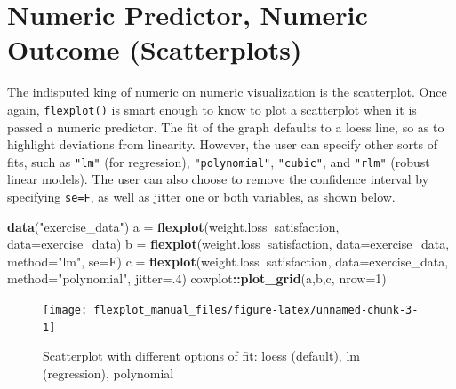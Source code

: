 \documentclass[,]{book}
\newenvironment{Shaded}{\begin{snugshade}}{\end{snugshade}}
\newcommand{\KeywordTok}[1]{\textcolor[rgb]{0.13,0.29,0.53}{\textbf{#1}}}
\newcommand{\DataTypeTok}[1]{\textcolor[rgb]{0.13,0.29,0.53}{#1}}
\newcommand{\DecValTok}[1]{\textcolor[rgb]{0.00,0.00,0.81}{#1}}
\newcommand{\StringTok}[1]{\textcolor[rgb]{0.31,0.60,0.02}{#1}}
\newcommand{\OperatorTok}[1]{\textcolor[rgb]{0.81,0.36,0.00}{\textbf{#1}}}
\newcommand{\NormalTok}[1]{#1}
\begin{document}
\section*{Numeric Predictor, Numeric Outcome
(Scatterplots)}\label{numeric-predictor-numeric-outcome-scatterplots}

The indisputed king of numeric on numeric visualization is the
scatterplot. Once again, \texttt{flexplot()} is smart enough to know to
plot a scatterplot when it is passed a numeric predictor. The fit of the
graph defaults to a loess line, so as to highlight deviations from
linearity. However, the user can specify other sorts of fits, such as
\texttt{"lm"} (for regression), \texttt{"polynomial"}, \texttt{"cubic"},
and \texttt{"rlm"} (robust linear models). The user can also choose to
remove the confidence interval by specifying \texttt{se=F}, as well as
jitter one or both variables, as shown below.

\begin{Shaded}
\begin{Highlighting}[]
\KeywordTok{data}\NormalTok{(}\StringTok{"exercise_data"}\NormalTok{)}
\NormalTok{a =}\StringTok{ }\KeywordTok{flexplot}\NormalTok{(weight.loss}\OperatorTok{~}\NormalTok{satisfaction, }\DataTypeTok{data=}\NormalTok{exercise_data)}
\NormalTok{b =}\StringTok{ }\KeywordTok{flexplot}\NormalTok{(weight.loss}\OperatorTok{~}\NormalTok{satisfaction, }\DataTypeTok{data=}\NormalTok{exercise_data, }
             \DataTypeTok{method=}\StringTok{"lm"}\NormalTok{, }\DataTypeTok{se=}\NormalTok{F)}
\NormalTok{c =}\StringTok{ }\KeywordTok{flexplot}\NormalTok{(weight.loss}\OperatorTok{~}\NormalTok{satisfaction, }\DataTypeTok{data=}\NormalTok{exercise_data, }
             \DataTypeTok{method=}\StringTok{"polynomial"}\NormalTok{, }\DataTypeTok{jitter=}\NormalTok{.}\DecValTok{4}\NormalTok{)}
\NormalTok{cowplot}\OperatorTok{::}\KeywordTok{plot_grid}\NormalTok{(a,b,c, }\DataTypeTok{nrow=}\DecValTok{1}\NormalTok{)}
\end{Highlighting}
\end{Shaded}

\begin{figure}

{\centering \texttt{[image: flexplot\_manual\_files/figure-latex/unnamed-chunk-3-1]} 

}

\caption{Scatterplot with different options of fit: loess (default), lm (regression), polynomial}\label{fig:unnamed-chunk-3}
\end{figure}
\end{document}
